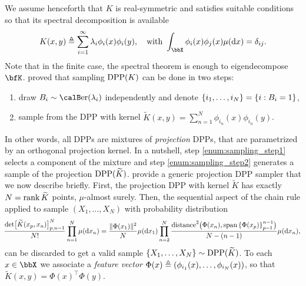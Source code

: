 \documentclass[twoside,11pt]{article}
\begin{document}
        We assume henceforth that $K$ is real-symmetric and satisfies suitable conditions \cite[Theorem 3]{Sos00} so that its spectral decomposition is available
        \begin{equation*}
        \label{eq:eigdec_kernel}
        K(x,y)
        \triangleq
          \suml_{i=1}^{\infty}
            \lambda_i \phi_i(x) \phi_i(y),
          \quad \text{with }
            \int_{\bbX} \phi_i(x) \phi_j(x) \mu(\diff x) = \delta_{ij}.
        \end{equation*}
        Note that in the finite case, the spectral theorem is enough to eigendecompose $\bfK$.
        \citet[Theorem 7]{HKPV06} proved that sampling $\operatorname{DPP}(K)$ can be done in two steps:
        \begin{enumerate}
            \item draw $B_i\sim\Ber(\lambda_i)$ independently and denote $\left\{ i_1,\dots,i_{N} \right\} = \left\{ i:B_i=1 \right\}$,\label{enum:sampling_step1}
            \item sample from the DPP with kernel $\tilde{K}(x,y) = \sum_{n=1}^{N}\phi_{i_n}(x) \phi_{i_n}(y)$.\label{enum:sampling_step2}
        \end{enumerate}
        In other words, all DPPs are mixtures of \emph{projection} DPPs, that are parametrized by an orthogonal projection kernel.
        In a nutshell, step \ref{enum:sampling_step1} selects a component of the mixture and step \ref{enum:sampling_step2} generates a sample of the projection $\operatorname{DPP}(\widetilde{K})$.
        \citet[Algorithm 18]{HKPV06} provide a generic projection DPP sampler that we now describe briefly.
        First, the projection DPP with kernel $\tilde{K}$ has exactly $N=\operatorname{rank} \widetilde{K}$ points, $\mu$-almost surely.
        Then, the sequential aspect of the chain rule applied to sample $(X_1,\dots,X_N)$ with probability distribution
        \begin{equation}
        \label{eq:joint_distribution}
        \!
        \small
        \frac{\det\!\big[\widetilde K(x_p,x_n)\big]_{p,n=1}^N}{N!}
            \prod_{n=1}^N \mu(\mathop{}\!\mathrm{d} x_n)
        =
                \frac{\|\Phi(x_1)\|^2}{N}
            \mu(\mathop{}\!\mathrm{d} x_1)
            \prod_{n=2}^{N}
                \frac{\operatorname{distance}^2\!\big(\Phi(x_n), \operatorname{span}\left\{ \Phi(x_p) \right\}_{p=1}^{n-1}\!\big)}{N-(n-1)}
                \mu(\mathop{}\!\mathrm{d} x_n),
        \end{equation}
        can be discarded to get a valid sample $\left\{ X_{1}, \dots, X_{N} \right\} \sim \operatorname{DPP}(\widetilde{K})$.
        To each $x\in\bbX$ we associate a \emph{feature vector}
        $\Phi(x) \triangleq \left( \phi_{i_1}(x),\dots,\phi_{i_N}(x) \right)$,
        so that
        $\tilde{K}(x,y) = \Phi(x)^{\top} \Phi(y)$.
\end{document}
